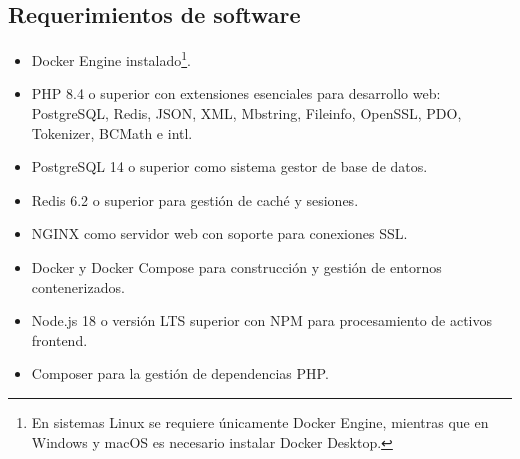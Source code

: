 \documentclass[journal]{IEEEtran}
\begin{document}
\subsection{Requerimientos de software}

\begin{itemize}
  \item Docker Engine instalado\footnote{En sistemas Linux se requiere únicamente Docker Engine, mientras que en Windows y macOS es necesario instalar Docker Desktop.}.

  \item PHP 8.4 o superior con extensiones esenciales para desarrollo web: PostgreSQL, Redis, JSON, XML, Mbstring, Fileinfo, OpenSSL, PDO, Tokenizer, BCMath e intl.

  \item PostgreSQL 14 o superior como sistema gestor de base de datos.

  \item Redis 6.2 o superior para gestión de caché y sesiones.

  \item NGINX como servidor web con soporte para conexiones SSL.

  \item Docker y Docker Compose para construcción y gestión de entornos contenerizados.

  \item Node.js 18 o versión LTS superior con NPM para procesamiento de activos frontend.

  \item Composer para la gestión de dependencias PHP.
\end{itemize}

%
%
\end{document}
